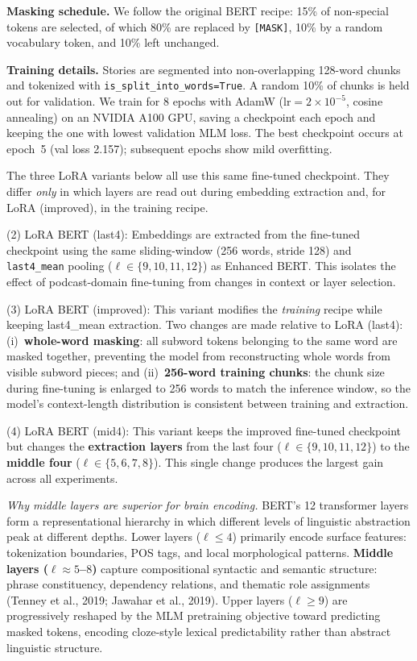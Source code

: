\textbf{Masking schedule.}
We follow the original BERT recipe: 15\% of non-special tokens are selected,
of which 80\% are replaced by \texttt{[MASK]}, 10\% by a random vocabulary
token, and 10\% left unchanged.

\textbf{Training details.}
Stories are segmented into non-overlapping 128-word chunks and tokenized with
\texttt{is\_split\_into\_words=True}.  A random 10\% of chunks is held out for
validation.  We train for 8 epochs with AdamW ($\text{lr} = 2 \times 10^{-5}$,
cosine annealing) on an NVIDIA A100 GPU, saving a checkpoint each epoch and
keeping the one with lowest validation MLM loss.  The best checkpoint occurs at
epoch~5 (val loss 2.157); subsequent epochs show mild overfitting.

The three LoRA variants below all use this same fine-tuned checkpoint.  They
differ \emph{only} in which layers are read out during embedding extraction and,
for LoRA (improved), in the training recipe.



(2) LoRA BERT (last4): Embeddings are extracted from the fine-tuned checkpoint using the same
sliding-window (256 words, stride 128) and \texttt{last4\_mean} pooling
($\ell \in \{9,10,11,12\}$) as Enhanced BERT.  This isolates the effect of
podcast-domain fine-tuning from changes in context or layer selection.



(3) LoRA BERT (improved): This variant modifies the \emph{training} recipe while keeping last4\_mean
extraction.  Two changes are made relative to LoRA (last4):
(i)~\textbf{whole-word masking}: all subword tokens belonging to the same
word are masked together, preventing the model from reconstructing whole words
from visible subword pieces; and
(ii)~\textbf{256-word training chunks}: the chunk size during fine-tuning is
enlarged to 256 words to match the inference window, so the model's
context-length distribution is consistent between training and extraction.



(4) LoRA BERT (mid4): This variant keeps the improved fine-tuned checkpoint but changes the
\textbf{extraction layers} from the last four ($\ell \in \{9,10,11,12\}$) to
the \textbf{middle four} ($\ell \in \{5,6,7,8\}$).  This single change produces
the largest gain across all experiments.

\textit{Why middle layers are superior for brain encoding.}
BERT's 12 transformer layers form a representational hierarchy in which
different levels of linguistic abstraction peak at different depths.  Lower
layers ($\ell \leq 4$) primarily encode surface features: tokenization
boundaries, POS tags, and local morphological patterns.  \textbf{Middle layers
($\ell \approx 5$--$8$)} capture compositional syntactic and semantic structure:
phrase constituency, dependency relations, and thematic role assignments
(Tenney et al., 2019; Jawahar et al., 2019).  Upper layers ($\ell \geq 9$)
are progressively reshaped by the MLM pretraining objective toward predicting
masked tokens, encoding cloze-style lexical predictability rather than abstract
linguistic structure.

